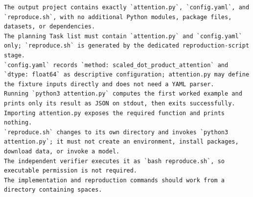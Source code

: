 \documentclass{article}
\begin{document}
\begin{verbatim}
The output project contains exactly `attention.py`, `config.yaml`, and `reproduce.sh`, with no additional Python modules, package files, datasets, or dependencies.
The planning Task list must contain `attention.py` and `config.yaml` only; `reproduce.sh` is generated by the dedicated reproduction-script stage.
`config.yaml` records `method: scaled_dot_product_attention` and `dtype: float64` as descriptive configuration; attention.py may define the fixture inputs directly and does not need a YAML parser.
Running `python3 attention.py` computes the first worked example and prints only its result as JSON on stdout, then exits successfully.
Importing attention.py exposes the required function and prints nothing.
`reproduce.sh` changes to its own directory and invokes `python3 attention.py`; it must not create an environment, install packages, download data, or invoke a model.
The independent verifier executes it as `bash reproduce.sh`, so executable permission is not required.
The implementation and reproduction commands should work from a directory containing spaces.

\end{verbatim}
\end{document}
